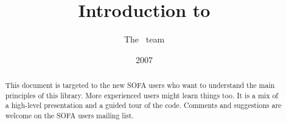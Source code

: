 \documentclass[a4paper,11pt]{article}
\title{Introduction to \sofa}
\author{The \sofa~team}
\date{2007}
\newcommand{\sofa}{SOFA }
\begin{document}
 
\maketitle

\begin{abstract}
This document is targeted to the new \sofa users who want to understand the main principles of this library. More experienced users might learn things too.
It is a mix of a high-level presentation and a guided tour of the code.
Comments and suggestions are welcome on the \sofa users mailing list.
\end{abstract}


\end{document}
